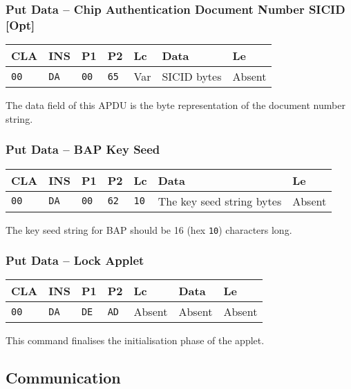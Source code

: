 \documentclass{article}
\begin{document}
\subsubsection{Put Data -- Chip Authentication Document Number SICID [Opt]}

\begin{flushleft}
\begin{tabular}{|l|l|l|l|l|l|l|}
\hline CLA & INS & P1 & P2 & Lc & Data & Le \\
\hline \texttt{00} & \texttt{DA} & \texttt{00} & \texttt{65} &
Var & SICID bytes &
Absent \\
\hline
\end{tabular}
\end{flushleft}
The data field of this APDU is the byte representation of the document
number string.

\subsubsection{Put Data -- BAP Key Seed}

\begin{flushleft}
\begin{tabular}{|l|l|l|l|l|l|l|}
\hline
CLA & INS & P1 & P2 & Lc & Data & Le \\
\hline
\texttt{00} & \texttt{DA} & \texttt{00} & \texttt{62} &
\texttt{10} & The key seed string bytes & Absent \\
\hline
\end{tabular}
\end{flushleft}
The key seed string for BAP should be 16 (hex \texttt{10}) characters
long.

\subsubsection{Put Data -- Lock Applet}

\begin{flushleft}
\begin{tabular}{|l|l|l|l|l|l|l|}
\hline
CLA & INS & P1 & P2 & Lc & Data & Le \\
\hline
\texttt{00} & \texttt{DA} & \texttt{DE} & \texttt{AD} &
Absent & Absent & Absent \\
\hline
\end{tabular}
\end{flushleft}
This command finalises the initialisation phase of the applet.

\subsection{Communication}
\end{document}
